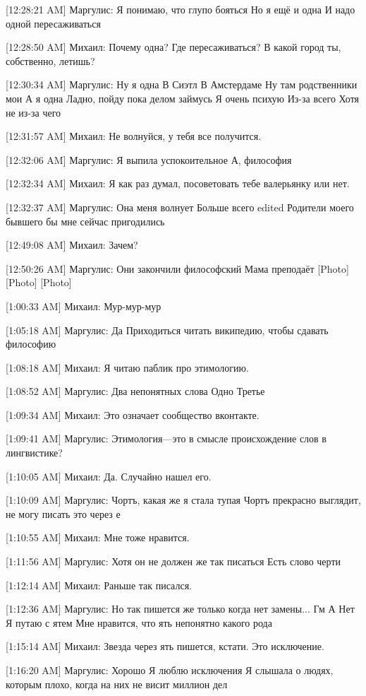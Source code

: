 \documentclass{article}
\begin{document}
[12:28:21 AM] Маргулис:
Я понимаю, что глупо бояться
 Но я ещё и одна
 И надо одной пересаживаться

[12:28:50 AM] Михаил:
Почему одна?
 Где пересаживаться? В какой город ты, собственно, летишь?

[12:30:34 AM] Маргулис:
Ну я одна
 В Сиэтл
 В Амстердаме
 Ну там родственники мои
 А я одна
 Ладно, пойду пока делом займусь
 Я очень психую
 Из-за всего
 Хотя не из-за чего

[12:31:57 AM] Михаил:
Не волнуйся, у тебя все получится.

[12:32:06 AM] Маргулис:
Я выпила успокоительное
 А, философия

[12:32:34 AM] Михаил:
Я как раз думал, посоветовать тебе валерьянку или нет.

[12:32:37 AM] Маргулис:
Она меня волнует
 Больше всего
edited 
Родители моего бывшего бы мне сейчас пригодились

[12:49:08 AM] Михаил:
Зачем?

[12:50:26 AM] Маргулис:
Они закончили философский
 Мама преподаёт
 [Photo]
 [Photo]
 [Photo]

[1:00:33 AM] Михаил:
Мур-мур-мур

[1:05:18 AM] Маргулис:
Да
 Приходиться читать википедию, чтобы сдавать философию

[1:08:18 AM] Михаил:
Я читаю паблик про этимологию.

[1:08:52 AM] Маргулис:
Два непонятных слова
 Одно
 Третье

[1:09:34 AM] Михаил:
Это означает сообщество вконтакте.

[1:09:41 AM] Маргулис:
Этимология—это в смысле происхождение слов в лингвистике?

[1:10:05 AM] Михаил:
Да. Случайно нашел его.

[1:10:09 AM] Маргулис:
Чортъ, какая же я стала тупая
 Чортъ прекрасно выглядит, не могу писать это через е

[1:10:55 AM] Михаил:
Мне тоже нравится.

[1:11:56 AM] Маргулис:
Хотя он не должен же так писаться
 Есть слово черти

[1:12:14 AM] Михаил:
Раньше так писался.

[1:12:36 AM] Маргулис:
Но так пишется же только когда нет замены...
 Гм
 А
 Нет
 Я путаю с ятем
 Мне нравится, что ять непонятно какого рода

[1:15:14 AM] Михаил:
Звезда через ять пишется, кстати. Это исключение.

[1:16:20 AM] Маргулис:
Хорошо
 Я люблю исключения
 Я слышала о людях, которым плохо, когда на них не висит миллион дел
\end{document}
